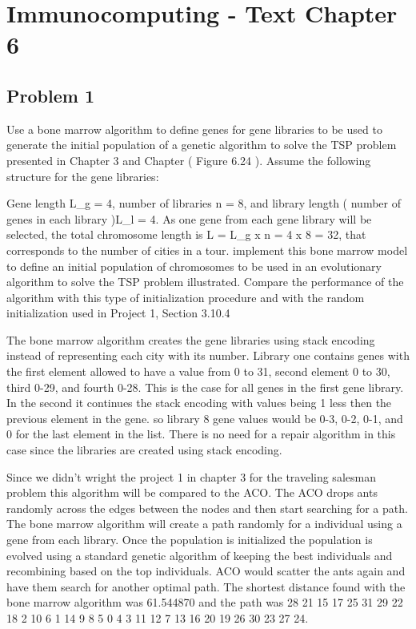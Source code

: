 
\chapter{Immunocomputing - Text Chapter 6}
\section{Problem 1}
\par
Use a bone marrow algorithm to define genes for gene libraries to be used to generate the initial population of a genetic algorithm to solve the TSP problem presented in Chapter 3 and Chapter  ( Figure 6.24 ). Assume the following structure for the gene libraries:
	
\newline
Gene length L_g = 4, number of libraries n = 8, and library length ( number of genes in each library )L_l = 4. As one gene from each gene library will be selected, the total chromosome length is L = L_g x n = 4 x 8 = 32, that corresponds to the number of cities in a tour.
\newline
implement this bone marrow model to define an initial population of chromosomes to be used in an evolutionary algorithm to solve the TSP problem illustrated. Compare the performance of the algorithm with this type of initialization procedure and with the random initialization used in Project 1, Section 3.10.4
\newline
\newline 
\par
The bone marrow algorithm creates the gene libraries using stack encoding instead of representing each city with its number. Library one contains genes with the first element allowed to have a value from 0 to 31, second element 0 to 30, third 0-29, and fourth 0-28. This is the case for all genes in the first gene library. In the second it continues the stack encoding with values being 1 less then the previous element in the gene. so library 8 gene values would be 0-3, 0-2, 0-1, and 0 for the last element in the list. There is no need for a repair algorithm in this case since the libraries are created using stack encoding.
\par
Since we didn't wright the project 1 in chapter 3 for the traveling salesman problem this algorithm will be compared to the ACO. The ACO drops ants randomly across the edges between the nodes and then start searching for a path. The bone marrow algorithm will create a path randomly for a individual using a gene from each library. Once the population is initialized the population is evolved using a standard genetic algorithm of keeping the best individuals and recombining based on the top individuals. ACO would scatter the ants again and have them search for another optimal path. The shortest distance found with the bone marrow algorithm was 61.544870 and the path was 28 21 15 17 25 31 29 22 18 2 10 6 1 14 9 8 5 0 4 3 11 12 7 13 16 20 19 26 30 23 27 24.


